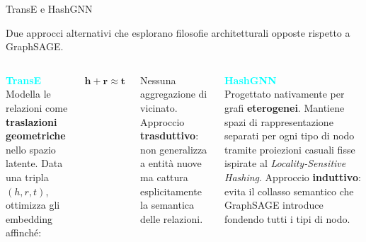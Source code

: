 \documentclass{beamer}
\begin{document}
\begin{frame}{TransE e HashGNN}

  Due approcci alternativi che esplorano filosofie architetturali
  opposte rispetto a GraphSAGE.

  \vspace{0.8em}

  \begin{columns}[t]
      \textcolor{Cyan}{\textbf{TransE}}\\[4pt]
      \small Modella le relazioni come \textbf{traslazioni geometriche}
      nello spazio latente. Data una tripla $(h, r, t)$, ottimizza
      gli embedding affinché:
      \begin{center}
        $\mathbf{h} + \mathbf{r} \approx \mathbf{t}$
      \end{center}
      Nessuna aggregazione di vicinato. Approccio \textbf{trasduttivo}:
      non generalizza a entità nuove ma cattura esplicitamente
      la semantica delle relazioni.

      \textcolor{Cyan}{\textbf{HashGNN}}\\[4pt]
      \small Progettato nativamente per grafi \textbf{eterogenei}.
      Mantiene spazi di rappresentazione separati per ogni tipo
      di nodo tramite proiezioni casuali fisse ispirate al
      \textit{Locality-Sensitive Hashing}.
      Approccio \textbf{induttivo}: evita il collasso semantico
      che GraphSAGE introduce fondendo tutti i tipi di nodo.

  \end{columns}

\end{frame}
\end{document}
